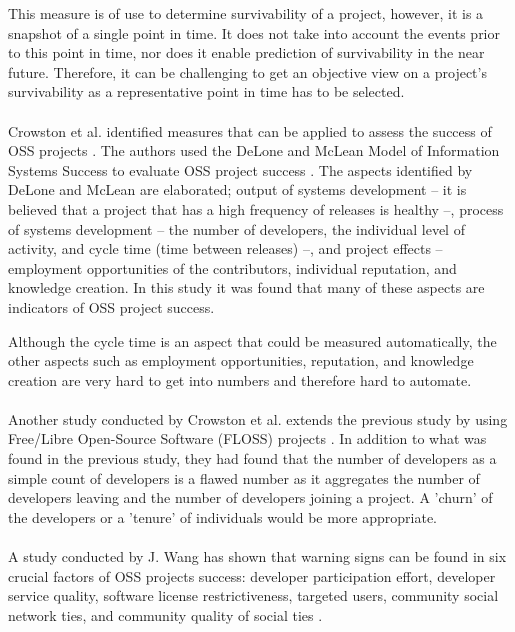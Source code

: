 This measure is of use to determine survivability of a project, however, it is
a snapshot of a single point in time. It does not take into account the events
prior to this point in time, nor does it enable prediction of survivability in
the near future. Therefore, it can be challenging to get an objective view on a
project's survivability as a representative point in time has to be selected.

\paragraph{}
Crowston et al. identified measures that can be applied to assess the success of
OSS projects \cite{crowston2003}. The authors used the DeLone and McLean Model
of Information Systems Success to evaluate OSS project success
\cite{delone1992}. The aspects identified by DeLone and McLean are elaborated;
output of systems development -- it is believed that a project that has a high
frequency of releases is healthy --, process of systems development -- the
number of developers, the individual level of activity, and cycle time (time
between releases) --, and project effects -- employment opportunities of the
contributors, individual reputation, and knowledge creation. In this study it
was found that many of these aspects are indicators of OSS project success.

Although the cycle time is an aspect that could be measured automatically, the
other aspects such as employment opportunities, reputation, and knowledge
creation are very hard to get into numbers and therefore hard to automate.

\paragraph{}
Another study conducted by Crowston et al. extends the previous study by using
Free/Libre Open-Source Software (FLOSS) projects \cite{crowston2006}. In
addition to what was found in the previous study, they had found that the number
of developers as a simple count of developers is a flawed number as it
aggregates the number of developers leaving and the number of developers
joining a project. A 'churn' of the developers or a 'tenure' of individuals
would be more appropriate.

\paragraph{}
A study conducted by J. Wang has shown that warning signs can be found in
six crucial factors of OSS projects success: developer participation effort,
developer service quality, software license restrictiveness, targeted users,
community social network ties, and community quality of social ties
\cite{wang2012}.

